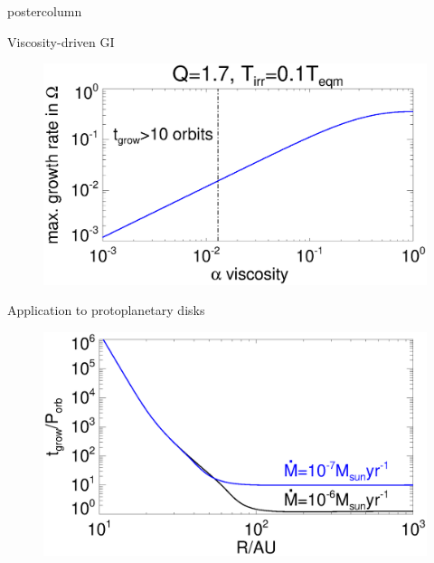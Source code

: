 \documentclass[final,hyperref={pdfpagelabels=false}]{beamer}
\begin{document}
\begin{frame}
\begin{columns}
\begin{column}{.49\textwidth}
\begin{beamercolorbox}[center,wd=\textwidth]{postercolumn}
\begin{minipage}[T]{.95\textwidth}
{            \begin{block}{{\Large Viscosity-driven GI}}
              \justifying
              \begin{figure}
                \includegraphics[width=\linewidth,clip=true,trim=0cm 0cm 0cm 0cm]{figures/result2d_gvisc}
              \end{figure}
            \end{block}
              
            \begin{block}{{\Large Application to protoplanetary disks}}
              \justifying
               \begin{figure}
                 \includegraphics[width=\linewidth,clip=true,trim=0cm 0cm 0cm 0cm]{figures/compare_result_growth}
              \end{figure}
            \end{block}
            

              
            
}
\end{minipage}
\end{beamercolorbox}
\end{column}
\end{columns}
\end{frame}
\end{document}
